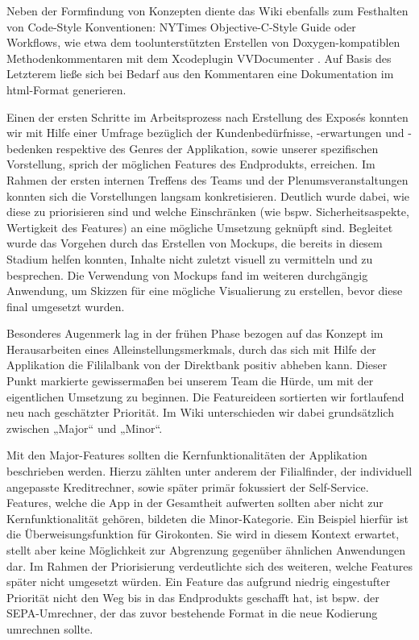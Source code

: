 	Neben der Formfindung von Konzepten diente das Wiki ebenfalls zum Festhalten von Code-Style Konventionen: NYTimes Objective-C-Style Guide \citep{NYStyleGuide14} oder Workflows, wie etwa dem toolunterstützten Erstellen von Doxygen-kompatiblen Methodenkommentaren mit dem Xcodeplugin VVDocumenter \citep{Wang14}. Auf Basis des Letzterem ließe sich bei Bedarf aus den Kommentaren eine Dokumentation im html-Format generieren. 

	Einen der ersten Schritte im Arbeitsprozess nach Erstellung des Exposés konnten wir mit Hilfe einer Umfrage bezüglich der Kundenbedürfnisse, -erwartungen und -bedenken respektive des Genres der Applikation, sowie unserer spezifischen Vorstellung, sprich der möglichen Features des Endprodukts, erreichen. Im Rahmen der ersten internen Treffens des Teams und der Plenumsveranstaltungen konnten sich die Vorstellungen langsam konkretisieren. Deutlich wurde dabei, wie diese zu priorisieren sind und welche Einschränken (wie bspw. Sicherheitsaspekte, Wertigkeit des Features) an eine mögliche Umsetzung geknüpft sind. Begleitet wurde das Vorgehen durch das Erstellen von Mockups, die bereits in diesem Stadium helfen konnten, Inhalte nicht zuletzt visuell zu vermitteln und zu besprechen. Die Verwendung von Mockups fand im weiteren durchgängig Anwendung, um Skizzen für eine mögliche Visualierung zu erstellen, bevor diese final umgesetzt wurden.

	Besonderes Augenmerk lag in der frühen Phase bezogen auf das Konzept im Herausarbeiten eines Alleinstellungsmerkmals, durch das sich mit Hilfe der Applikation die Fililalbank von der Direktbank positiv abheben kann. Dieser Punkt markierte gewissermaßen bei unserem Team die Hürde, um mit der eigentlichen Umsetzung zu beginnen. Die Featureideen sortierten wir fortlaufend neu nach geschätzter Priorität. Im Wiki unterschieden wir dabei grundsätzlich zwischen „Major“ und „Minor“.  
	
	Mit den Major-Features sollten die Kernfunktionalitäten der Applikation beschrieben werden. Hierzu zählten unter anderem der Filialfinder, der individuell angepasste Kreditrechner, sowie später primär fokussiert der Self-Service. Features, welche die App in der Gesamtheit aufwerten sollten aber nicht zur Kernfunktionalität gehören, bildeten die Minor-Kategorie. Ein Beispiel hierfür ist die Überweisungsfunktion für Girokonten. Sie wird in diesem Kontext erwartet, stellt aber keine Möglichkeit zur Abgrenzung gegenüber ähnlichen Anwendungen dar. Im Rahmen der Priorisierung verdeutlichte sich des weiteren, welche Features später nicht umgesetzt würden. Ein Feature das aufgrund niedrig eingestufter Priorität nicht den Weg bis in das Endprodukts geschafft hat, ist bspw. der SEPA-Umrechner, der das zuvor bestehende Format in die neue Kodierung umrechnen sollte. 
	
